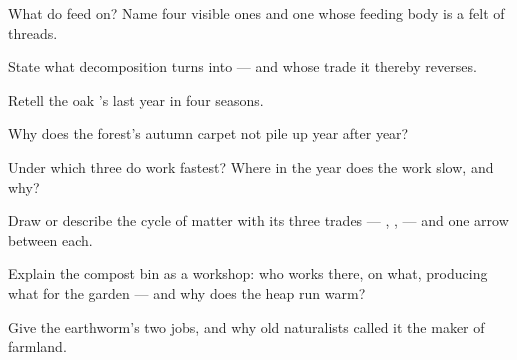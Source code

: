 \begin{exercise}[$\star$]\label{exo:g6:decomposers-and-soil:2}
What do  feed on? Name four visible ones and one
whose feeding body is a felt of threads.
\end{exercise}

\begin{exercise}[$\star$]\label{exo:g6:decomposers-and-soil:3}
State what decomposition turns  into --- and
whose trade it thereby reverses.
\end{exercise}

\begin{exercise}[$\star$]\label{exo:g6:decomposers-and-soil:4}
Retell the oak 's last year in four seasons.
\end{exercise}

\begin{exercise}[$\star$]\label{exo:g6:decomposers-and-soil:5}
Why does the forest's autumn carpet not pile up year after
year?
\end{exercise}

\begin{exercise}[$\star$]\label{exo:g6:decomposers-and-soil:6}
Under which three  do  work fastest?
Where in the year does the work slow, and why?
\end{exercise}

\begin{exercise}[$\star\star$]\label{exo:g6:decomposers-and-soil:7}
Draw or describe the cycle of matter with its three trades
--- , ,  --- and one arrow
between each.
\end{exercise}

\begin{exercise}[$\star\star$]\label{exo:g6:decomposers-and-soil:8}
Explain the compost bin as a  workshop: who
works there, on what, producing what for the garden --- and
why does the heap run warm?
\end{exercise}

\begin{exercise}[$\star\star$]\label{exo:g6:decomposers-and-soil:9}
Give the earthworm's two jobs, and why old naturalists
called it the maker of farmland.
\end{exercise}


